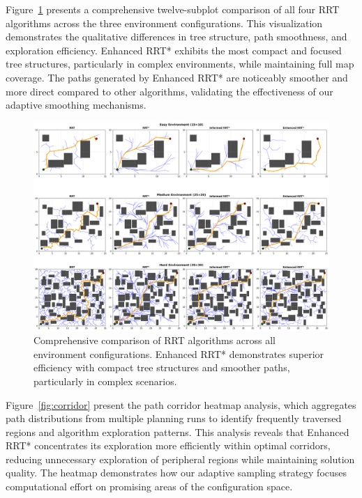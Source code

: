 \documentclass[pdflatex,sn-mathphys-num]{sn-jnl}
\theoremstyle{thmstyleone}%
\theoremstyle{thmstyletwo}%
\theoremstyle{thmstylethree}%
\begin{document}
Figure~\ref{fig:twelve_plots} presents a comprehensive twelve-subplot comparison of all four RRT algorithms across the three environment configurations. This visualization demonstrates the qualitative differences in tree structure, path smoothness, and exploration efficiency. Enhanced RRT* exhibits the most compact and focused tree structures, particularly in complex environments, while maintaining full map coverage. The paths generated by Enhanced RRT* are noticeably smoother and more direct compared to other algorithms, validating the effectiveness of our adaptive smoothing mechanisms.

\begin{figure}[htbp]
\centering
\includegraphics[width=\textwidth]{twelve_plot.png}
\caption{Comprehensive comparison of RRT algorithms across all environment configurations. Enhanced RRT* demonstrates superior efficiency with compact tree structures and smoother paths, particularly in complex scenarios.}
\label{fig:twelve_plots}
\end{figure}

Figure~\ref{fig:corridor} present the path corridor heatmap analysis, which aggregates path distributions from multiple planning runs to identify frequently traversed regions and algorithm exploration patterns. This analysis reveals that Enhanced RRT* concentrates its exploration more efficiently within optimal corridors, reducing unnecessary exploration of peripheral regions while maintaining solution quality. The heatmap demonstrates how our adaptive sampling strategy focuses computational effort on promising areas of the configuration space.
\end{document}
